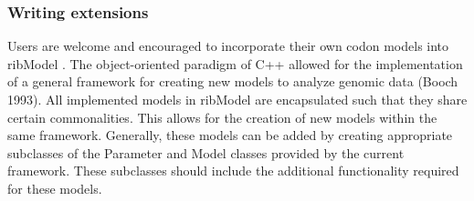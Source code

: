 \documentclass{bioinfo}
\newcommand{\package}{ribModel } %
\begin{document}
\subsubsection*{Writing extensions}
Users are welcome and encouraged to incorporate their own codon models into \package. The object-oriented paradigm of C++ allowed for the implementation of a general framework for creating new models to analyze genomic data (Booch 1993). All implemented models in \package are encapsulated such that they share certain commonalities. This allows for the creation of new models within the same framework. Generally, these models can be added by creating appropriate subclasses of the Parameter and Model classes provided by the current framework. These subclasses should include the additional functionality required for these models. 



%
%
\end{document}
